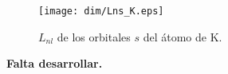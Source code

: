 \begin{figure}
\centering
\texttt{[image: dim/Lns\_K.eps]} 
\caption[$L_{nl}$.]
{$L_{nl}$ de los orbitales $s$ del átomo de K.}
\label{fig:dr2sK}
\end{figure}

\vspace{1cm}


\noindent
{\bf \color{red} Falta desarrollar.}

\begin{comment}
Por otro lado, todas las funciones de ondas 
de los electrones ligados decaen exponencialmente para distancias 
mayores al punto de retorno clásico. El punto de retorno clásico se 
define como la posición $r_{rc}$ en la cual la energía es igual al 
potencial efectivo. 

\begin{equation}
\lim_{r\rightarrow\infty} u_{nl}^{\mathrm{HF}}
= \exp\left(\sqrt{-2\varepsilon_{nl}^{\mathrm{HF}}} r\right)
\end{equation}

\begin{equation}
L_{nl}(r) \equiv r\frac{d\log u_{nl}}{dr}
\end{equation}

Este comportamiento ha llevado al consenso general de que el método 
de inversión sólo puede implementarse en orbitales sin 
nodos~\cite{Kananenka:13}. Por otro lado, una dificultad numérica menos 
obvia está dada por la razón entre la 
derivada de la función de onda y la función de onda en sí. 
{\color{red} Escribir sobre el primer paper de Adv. Quant. Chem y sobre 
la respuesta al comment de Cinal.}


At first glance, it seems that the turning point of $u_{2s}$ 
is located around $r_{tp} \approx 0.25$, and from that point on,  
the wavefunction should start to decay exponentially.
From the numerically point of view, say $r \approx 10 \, r_{tp}$ is 
a good point to stop the inversion, since beyond there, the effective 
charge could begin to diverge.



\end{comment}
